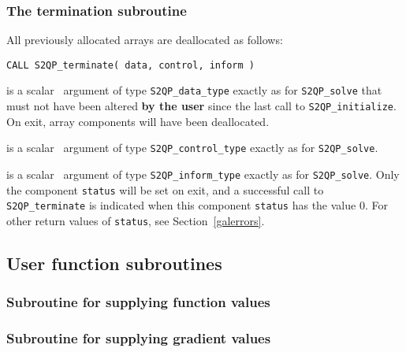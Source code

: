 \documentclass{galahad}
\newcommand{\packagename}{S2QP}
\begin{document}

\subsubsection{The  termination subroutine}
All previously allocated arrays are deallocated as follows:
\vspace*{1mm}

\hspace{8mm}
{\tt CALL \packagename\_terminate( data, control, inform )}

\vspace*{-3mm}
\begin{description}

 is a scalar \intentinout\ argument of type
{\tt \packagename\_data\_type}
exactly as for
{\tt \packagename\_solve}
that must not have been altered {\bf by the user} since the last call to
{\tt \packagename\_initialize}.
On exit, array components will have been deallocated.

 is a scalar \intentin\ argument of type
{\tt \packagename\_control\_type}
exactly as for
{\tt \packagename\_solve}.

 is a scalar \intentout\ argument of type
{\tt \packagename\_inform\_type}
exactly as for
{\tt \packagename\_solve}.
Only the component {\tt status} will be set on exit, and a
successful call to
{\tt \packagename\_terminate}
is indicated when this  component {\tt status} has the value 0.
For other return values of {\tt status}, see Section~\ref{galerrors}.

\end{description}


\subsection{User function subroutines}\label{functions}



\subsubsection{Subroutine for supplying function values}\label{FC}


\subsubsection{Subroutine for supplying gradient values}\label{GJ}
\end{document}
